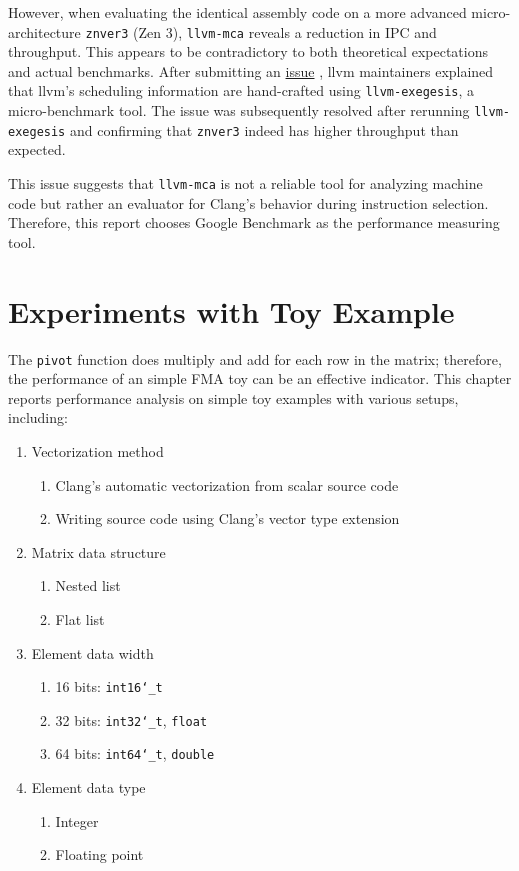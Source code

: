 \documentclass[logo,bsc,singlespacing,parskip]{infthesis}
\newcommand{\dtshort}{\texttt{int16\char`_t}}
\newcommand{\dtint}{\texttt{int32\char`_t}}
\newcommand{\dtlong}{\texttt{int64\char`_t}}
\newcommand{\dtfloat}{\texttt{float}}
\newcommand{\dtdouble}{\texttt{double}}
\newcommand{\pivot}{\texttt{pivot}}
\newcommand{\mca}{\texttt{llvm-mca}}
\newcommand{\exegesis}{\texttt{llvm-exegesis}}
\newenvironment{compactlist}
{ \begin{enumerate}
    \setlength{\itemsep}{0pt}
    \setlength{\parskip}{0pt}
    \setlength{\parsep}{0pt}     
}
{ \end{enumerate} }
\begin{document}

However, when evaluating the identical assembly code on a more advanced
micro-architecture \texttt{znver3} (Zen 3), \mca{} reveals a reduction in IPC and
throughput. This appears to be contradictory to both theoretical expectations
and actual benchmarks. After submitting an
\href{https://github.com/llvm/llvm-project/issues/59325}{issue}
\cite{mca-issue}, llvm maintainers explained that llvm's scheduling information
are hand-crafted using \exegesis{}, a micro-benchmark tool. The issue was
subsequently resolved after rerunning \exegesis{} and confirming that
\texttt{znver3} indeed has higher throughput than expected. 

This issue suggests that \mca{} is not a reliable tool for analyzing machine
code but rather an evaluator for Clang's behavior during instruction selection.
Therefore, this report chooses Google Benchmark as the performance measuring
tool.


\chapter{Experiments with Toy Example}
\label{sec:Toy}

The \pivot{} function does multiply and add for each row in the matrix;
therefore, the performance of an simple FMA toy can be an effective indicator.
This chapter reports performance analysis on simple toy examples with various
setups, including: 

\begin{enumerate} 
    \item Vectorization method 
        \begin{compactlist} 
            \item Clang's automatic vectorization from scalar source code
            \item Writing source code using Clang's vector type extension
        \end{compactlist}
    \item Matrix data structure 
        \begin{compactlist} 
            \item Nested list
            \item Flat list
        \end{compactlist}
    \item Element data width
        \begin{compactlist} 
            \item 16 bits: \dtshort{}
            \item 32 bits: \dtint{}, \dtfloat{}
            \item 64 bits: \dtlong{}, \dtdouble{}
        \end{compactlist}
    \item Element data type 
        \begin{compactlist} 
            \item Integer
            \item Floating point
        \end{compactlist}
\end{enumerate}
\end{document}
